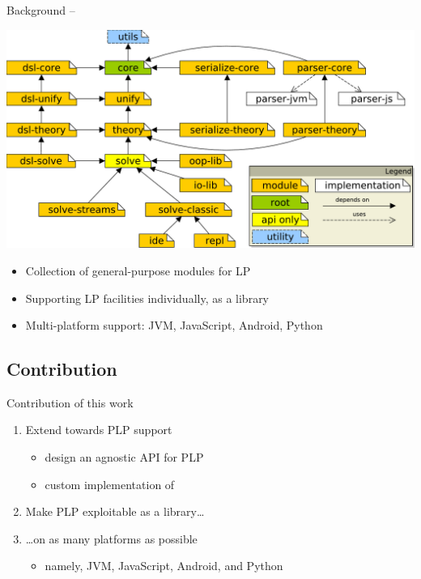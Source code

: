 \documentclass[presentation]{beamer}\mode<presentation>{\usetheme{AMSBolognaFC}}
\begin{document}
\begin{frame}[c]{Background -- \twopkt{} \hfill {}}

    \begin{center}
        \includegraphics[width=.7\linewidth]{img/project-map.pdf}
    \end{center}
    \begin{itemize}\small
        \item Collection of general-purpose modules for LP
        \item Supporting LP facilities individually, \alert{as a library}
        \item Multi-platform support: JVM, JavaScript, Android, Python\footnotemark
    \end{itemize}


\end{frame}

\subsection{Contribution}

\begin{frame}[c]{Contribution of this work}

    \begin{enumerate}
        \item Extend \twopkt{} towards PLP support
        \begin{itemize}
            \item design an agnostic API for PLP
            \item custom implementation of \problog{}
        \end{itemize}

        \vfill

        \item Make PLP exploitable as a library\ldots

        \vfill

        \item \ldots on as many platforms as possible
        \begin{itemize}
            \item namely, JVM, JavaScript, Android, and Python
        \end{itemize}

    \end{enumerate}

\end{frame}
\end{document}
